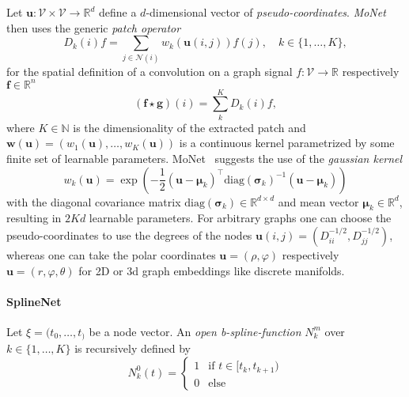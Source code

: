 \documentclass[pdftex,10pt,a4paper]{scrartcl}
\begin{document}
Let $\mathbf{u} \colon \mathcal{V} \times \mathcal{V} \to \mathbb{R}^d$ define a $d$-dimensional vector of \emph{pseudo-coordinates}.
\emph{MoNet}~\cite{Monti2016} then uses the generic \emph{patch operator}
\begin{equation*}
  D_k(i)f = \sum_{j \in \mathcal{N}(i)} w_k(\mathbf{u}(i, j)) f(j), \quad k \in \{ 1, \ldots, K \},
\end{equation*}
for the spatial definition of a convolution on a graph signal $f \colon \mathcal{V} \to \mathbb{R}$ respectively $\mathbf{f} \in \mathbb{R}^n$
\begin{equation*}
  (\mathbf{f} \star \mathbf{g})(i) = \sum_k^K D_k(i)f,
\end{equation*}
where $K \in \mathbb{N}$ is the dimensionality of the extracted patch and $\mathbf{w}(\mathbf{u}) = (w_1(\mathbf{u}), \ldots, w_K(\mathbf{u}))$ is a continuous kernel parametrized by some finite set of learnable parameters.
MoNet~\cite{Monti2016} suggests the use of the \emph{gaussian kernel}
\begin{equation*}
  w_k(\mathbf{u}) = \exp \left(-\frac{1}{2} {(\mathbf{u} - \boldsymbol{\mu}_k)}^{\top} {\mathrm{diag}(\boldsymbol{\sigma}_k)}^{-1} (\mathbf{u} - \boldsymbol{\mu}_k) \right)
\end{equation*}
with the diagonal covariance matrix $\mathrm{diag}(\boldsymbol{\sigma}_k) \in \mathbb{R}^{d \times d}$ and mean vector $\boldsymbol{\mu}_k \in \mathbb{R}^d$, resulting in $2Kd$ learnable parameters.
For arbitrary graphs one can choose the pseudo-coordinates to use the degrees of the nodes $\mathbf{u}(i,j) = \left( D_{ii}^{-1/2}, D_{jj}^{-1/2} \right)$, whereas one can take the polar coordinates $\mathbf{u} = (\rho, \varphi)$ respectively $\mathbf{u} = (r, \varphi, \theta)$ for 2D or 3d graph embeddings like discrete manifolds.

\paragraph{SplineNet}

Let $\xi = (t_0, \ldots, t_)$ be a node vector.
An \emph{open b-spline-function} $N_k^m$ over $k \in \{ 1, \ldots, K \}$ is recursively defined by
\begin{equation*}
  N_k^0(t) = \begin{cases}
    1 & \text{if } t \in [t_k, t_{k+1})\\
    0 & \text{else}
  \end{cases}
\end{equation*}
\end{document}
